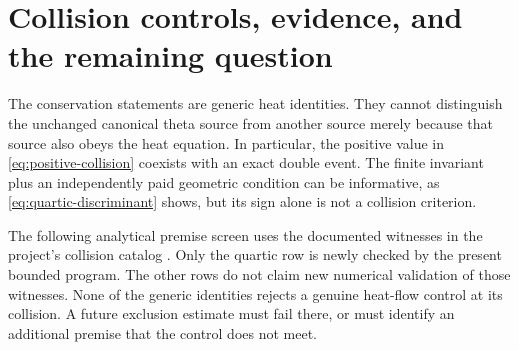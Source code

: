 \section{Collision controls, evidence, and the remaining question}
\label{sec:controls}

The conservation statements are generic heat identities. They cannot
distinguish the unchanged canonical theta source from another source
merely because that source also obeys the heat equation. In particular,
the positive value in \eqref{eq:positive-collision} coexists with an
exact double event. The finite invariant plus an independently paid
geometric condition can be informative, as
\eqref{eq:quartic-discriminant} shows, but its sign alone is not
a collision criterion.

The following analytical premise screen uses the documented witnesses
in the project's collision catalog \cite{ProjectControls2026}.
Only the quartic row is newly checked by the present bounded program.
The other rows do not claim new numerical validation of those witnesses.
None of the generic identities rejects a genuine heat-flow control
at its collision. A future exclusion estimate must fail there, or
must identify an additional premise that the control does not meet.

